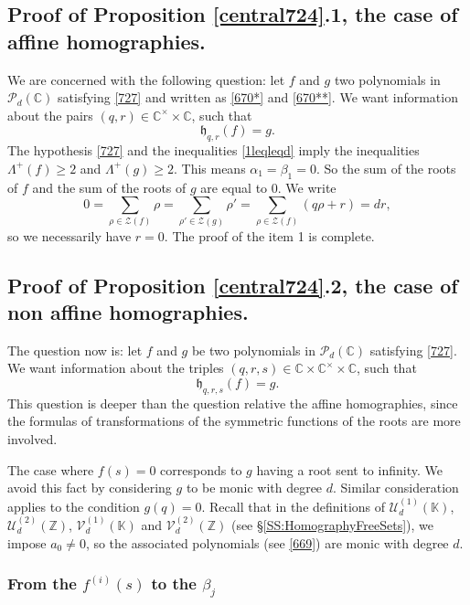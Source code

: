 \documentclass[10pt]{article}
\theoremstyle{definition}
\numberwithin{equation}{section}
\newcommand {\C}{{\mathbb{C}}}
\newcommand {\Z}{{\mathbb{Z}}}
\newcommand {\K}{{\mathbb{K}}}
\begin{document}
\subsection{Proof of Proposition \ref{central724}.1, the case of affine homographies.}\label{firstcase}

We are concerned with the following question: let $f$ and $g$ two polynomials in $\mathcal P_d (\C)$ satisfying \eqref{727} and written as \eqref{670*} and \eqref{670**}. We want information about the pairs $(q,r)\in \C^\times \times \C$, such that 
\[
\mathfrak h_{q,r} (f) = g.
\]
The hypothesis \eqref{727} and the inequalities \eqref{1leqleqd} imply the inequalities $\Lambda^+ (f) \geqslant 2$ and $ \Lambda^+ (g) \geqslant 2$. This means $\alpha_1=\beta_1 =0$. So the sum of the roots of $
f$ and the sum of the roots of $g$ are equal to $0$. We write 
\[
0= \sum_{\rho \in \mathcal Z (f)} \rho = \sum_{\rho' \in \mathcal Z (g) } \rho' = \sum_{\rho \in \mathcal Z (f)} (q\rho +r) =dr,
\]
so we necessarily have $r=0$. The proof of the item 1 is complete. 
 
\subsection{Proof of Proposition \ref{central724}.2, the case of non affine homographies.} 

The question now is: let $f$ and $g$ be two polynomials in $\mathcal P_d (\C)$ satisfying \eqref{727}. We want information about the triples $(q,r,s)\in \C \times \C^\times\times \C$, such that 
\[
\mathfrak h_{q,r,s} (f) = g.
\]
This question is deeper than the question relative the affine homographies, since the formulas of transformations of the symmetric functions of the roots are more involved.

The case where $f(s)= 0$ corresponds to $g$ having a root sent to infinity. We avoid this fact by considering $g$ to be monic with degree $d$. Similar consideration applies to the condition $g(q)= 0$. Recall that in the definitions of $\mathcal U_d ^{(1)}(\K)$, $\mathcal U_d ^{(2)}(\Z)$, $\mathcal V_d^{(1)}( \K)$ and $\mathcal V_d^{(2)}( \Z)$ (see \S\ref{SS:HomographyFreeSets}), we impose $a_0\neq 0$, so the associated polynomials (see \eqref{669}) are monic with degree $d$. 
 
\subsubsection{From the $f^{(i)}(s) $ to the $\beta_j$}
\end{document}
